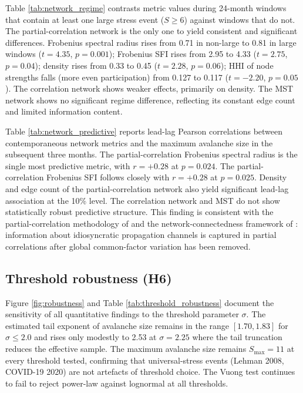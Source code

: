 \documentclass[12pt,a4paper]{article}
\newcommand{\Stmax}{S_{\max}}
\begin{document}
Table \ref{tab:network_regime} contrasts metric values during 24-month
windows that contain at least one large stress event ($S\geq 6$) against
windows that do not. The partial-correlation network is the only one to yield
consistent and significant differences. Frobenius spectral radius rises from
0.71 in non-large to 0.81 in large windows ($t=4.35$, $p=0.001$); Frobenius
SFI rises from 2.95 to 4.33 ($t=2.75$, $p=0.04$); density rises from 0.33 to
0.45 ($t=2.28$, $p=0.06$); HHI of node strengths falls (more even
participation) from 0.127 to 0.117 ($t=-2.20$, $p=0.05$). The
correlation network shows weaker effects, primarily on density. The MST
network shows no significant regime difference, reflecting its constant
edge count and limited information content.



Table \ref{tab:network_predictive} reports lead-lag Pearson correlations
between contemporaneous network metrics and the maximum avalanche size in
the subsequent three months. The partial-correlation Frobenius spectral
radius is the single most predictive metric, with $r=+0.28$ at $p=0.024$.
The partial-correlation Frobenius SFI follows closely with $r=+0.28$ at
$p=0.025$. Density and edge count of the partial-correlation network also
yield significant lead-lag association at the 10\% level. The correlation
network and MST do not show statistically robust predictive structure. This
finding is consistent with the partial-correlation methodology of
\citet{Mantegna1999} and the network-connectedness framework of
\citet{Diebold2014}: information about idiosyncratic propagation channels is
captured in partial correlations after global common-factor variation has
been removed.

\subsection{Threshold robustness (H6)}

Figure \ref{fig:robustness} and Table \ref{tab:threshold_robustness}
document the sensitivity of all quantitative findings to the threshold
parameter $\sigma$. The estimated tail exponent of avalanche size remains
in the range $[1.70, 1.83]$ for $\sigma\leq 2.0$ and rises only modestly to
2.53 at $\sigma=2.25$ where the tail truncation reduces the effective sample.
The maximum avalanche size remains $\Stmax=11$ at every threshold tested,
confirming that universal-stress events (Lehman 2008, COVID-19 2020) are
not artefacts of threshold choice. The Vuong test continues to fail to
reject power-law against lognormal at all thresholds.
\end{document}
